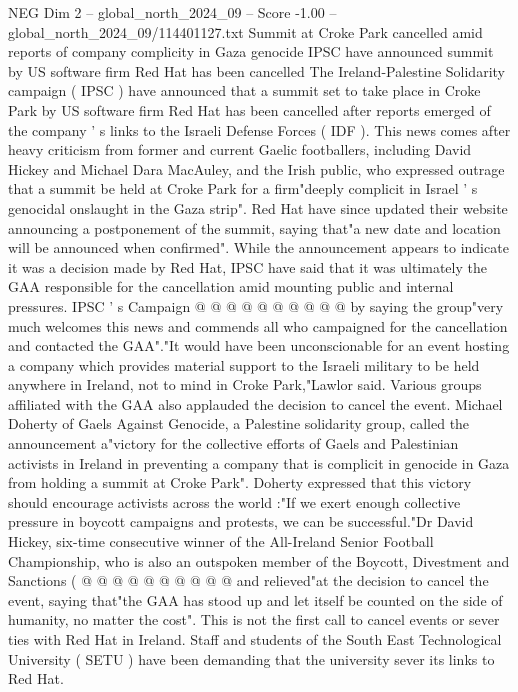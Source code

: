 \begin{textsample}{NEG Dim 2 – global\_north\_2024\_09 – Score -1.00 – global\_north\_2024\_09/114401127.txt}  \label{ex:f2_neg_030}
Summit at Croke Park cancelled amid reports of company complicity in Gaza genocide IPSC have announced summit by US software firm Red Hat has been cancelled The Ireland-Palestine Solidarity campaign ( IPSC ) have announced that a summit set to take place in Croke Park by US software firm Red Hat has been cancelled after reports emerged of the company ' s links to the Israeli Defense Forces ( IDF ).
This news comes after heavy criticism from former and current Gaelic footballers, including David Hickey and Michael Dara MacAuley, and the Irish public, who expressed outrage that a summit be held at Croke Park for a firm"deeply complicit in Israel ' s genocidal onslaught in the Gaza strip".
Red Hat have since updated their website announcing a postponement of the summit, saying that"a new date and location will be announced when confirmed".
While the announcement appears to indicate it was a decision made by Red Hat, IPSC have said that it was ultimately the GAA responsible for the cancellation amid mounting public and internal pressures.
IPSC ' s Campaign @ @ @ @ @ @ @ @ @ @ by saying the group"very much welcomes this news and commends all who campaigned for the cancellation and contacted the GAA"."It would have been unconscionable for an event hosting a company which provides material support to the Israeli military to be held anywhere in Ireland, not to mind in Croke Park,"Lawlor said.
Various groups affiliated with the GAA also applauded the decision to cancel the event.
Michael Doherty of Gaels Against Genocide, a Palestine solidarity group, called the announcement a"victory for the collective efforts of Gaels and Palestinian activists in Ireland in preventing a company that is complicit in genocide in Gaza from holding a summit at Croke Park".
Doherty expressed that this victory should encourage activists across the world :"If we exert enough collective pressure in boycott campaigns and protests, we can be successful."Dr David Hickey, six-time consecutive winner of the All-Ireland Senior Football Championship, who is also an outspoken member of the Boycott, Divestment and Sanctions ( @ @ @ @ @ @ @ @ @ @ and relieved"at the decision to cancel the event, saying that"the GAA has stood up and let itself be counted on the side of humanity, no matter the cost".
This is not the first call to cancel events or sever ties with Red Hat in Ireland.
Staff and students of the South East Technological University ( SETU ) have been demanding that the university sever its links to Red Hat.

\end{textsample}
